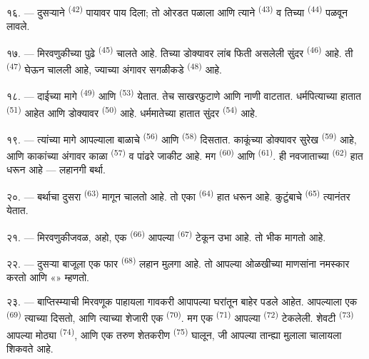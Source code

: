 १६. --- दुसऱ्याने  \textsuperscript{(42)} पायावर पाय दिला;
तो ओरडत पळाला आणि त्याने  \textsuperscript{(43)} व तिच्या
 \textsuperscript{(44)} पळवून लावले.

\VUsaut{5.0mm}
\VUsaut{4.0mm}

१७. --- मिरवणुकीच्या पुढे  \textsuperscript{(45)} चालते आहे. तिच्या
डोक्यावर लांब फिती असलेली सुंदर  \textsuperscript{(46)} आहे. ती
 \textsuperscript{(47)} घेऊन चालली आहे, ज्याच्या अंगावर
सगळीकडे  \textsuperscript{(48)} आहे.

१८. --- दाईच्या मागे  \textsuperscript{(49)} आणि
 \textsuperscript{(53)} येतात. तेच साखरफुटाणे आणि नाणी वाटतात.
धर्मपित्याच्या हातात  \textsuperscript{(51)} आहेत आणि डोक्यावर
 \textsuperscript{(50)} आहे. धर्ममातेच्या हातात सुंदर
 \textsuperscript{(54)} आहे.

१९. --- त्यांच्या मागे आपल्याला बाळाचे  \textsuperscript{(56)} आणि
 \textsuperscript{(58)} दिसतात. काकूंच्या डोक्यावर सुरेख
 \textsuperscript{(59)} आहे, आणि काकांच्या अंगावर काळा  \textsuperscript{(57)} व पांढरे जाकीट आहे. मग 
\textsuperscript{(60)} आणि  \textsuperscript{(61)}. ही
नवजाताच्या  \textsuperscript{(62)} हात धरून आहे --- लहानगी बर्था.

२०. --- बर्थाचा दुसरा  \textsuperscript{(63)} मागून चालतो आहे. तो एका
 \textsuperscript{(64)} हात धरून आहे. कुटुंबाचे
 \textsuperscript{(65)} त्यानंतर येतात.

\VUsaut{4.6mm}
\VUsaut{3.4mm}

२१. --- मिरवणुकीजवळ, अहो, एक  \textsuperscript{(66)} आपल्या
 \textsuperscript{(67)} टेकून उभा आहे. तो भीक मागतो आहे.

२२. --- दुसऱ्या बाजूला एक फार  \textsuperscript{(68)} लहान मुलगा आहे.
तो आपल्या ओळखीच्या माणसांना नमस्कार करतो आणि «» म्हणतो.

२३. --- बाप्तिस्म्याची मिरवणूक पाहायला गावकरी आपापल्या घरांतून बाहेर पडले आहेत.
आपल्याला एक  \textsuperscript{(69)} त्याच्या 
दिसतो, आणि त्याच्या शेजारी एक  \textsuperscript{(70)}. मग एक
 \textsuperscript{(71)} आपल्या 
\textsuperscript{(72)} टेकलेली. शेवटी  \textsuperscript{(73)}
आपल्या मोठ्या  \textsuperscript{(74)}, आणि एक तरुण शेतकरीण
 \textsuperscript{(75)} घालून, जी आपल्या तान्ह्या मुलाला चालायला
शिकवते आहे.

